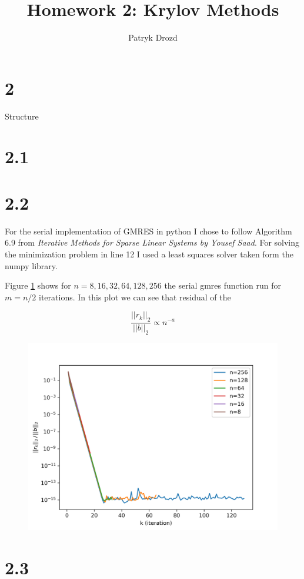 \documentclass[a4paper]{article}
\title{Homework 2: Krylov Methods}
\author{Patryk Drozd}
\begin{document}
\date{}
\maketitle

\section*{2}
	Structure

\section*{2.1}

\section*{2.2}
	
	For the serial implementation of GMRES in python I chose to follow Algorithm 6.9 from 
	\textit{Iterative Methods for Sparse Linear Systems by Yousef Saad}. For solving the 
	minimization problem in line 12 I used a least squares solver taken form the numpy 
	library.

	Figure \ref{fig:q2_fig} shows for $n = 8, 16, 32, 64, 128, 256$ the serial gmres function run
	for $m = n/2$ iterations. In this plot we can see that residual of the 

	$$\frac{||r_k||_2}{||b||_2} \propto n^{-a}$$


	\begin{figure}[h!]
	    \centering
    	\includegraphics[width=.8\linewidth]{./q2_fig.png}
    	\label{fig:q2_fig}
	\end{figure}

\section*{2.3}
		


 
 
\end{document}
